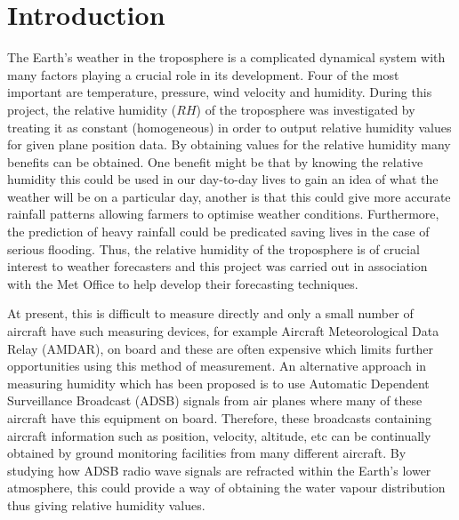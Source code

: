 \documentclass[11pt]{article}
\begin{document}
\vspace{5mm} %

\newpage

\tableofcontents


\setcounter{page}{1} %

\newpage


\section{Introduction}
\label{sec:introduction}

The Earth's weather in the troposphere is a complicated dynamical system with many factors playing a crucial role in its development. Four of the most important are temperature, pressure, wind velocity and humidity. During this project, the relative humidity ($RH$) of the troposphere was investigated by treating it as constant (homogeneous) in order to output relative humidity values for given plane position data. By obtaining values for the relative humidity many benefits can be obtained. One benefit might be that by knowing the relative humidity this could be used in our day-to-day lives to gain an idea of what the weather will be on a particular day, another is that this could give more accurate rainfall patterns allowing farmers to optimise weather conditions. Furthermore, the prediction of heavy rainfall could be predicated {\textemdash} saving lives in the case of serious flooding. Thus, the relative humidity of the troposphere is of crucial interest to weather forecasters and this project was carried out in association with the Met Office to help develop their forecasting techniques.

\vspace{2mm}
\noindent
At present, this is difficult to measure directly and only a small number of aircraft have such measuring devices, for example Aircraft Meteorological Data Relay (AMDAR), on board \cite{Paper01} and these are often expensive which limits further opportunities using this method of measurement. An alternative approach in measuring humidity which has been proposed \cite{Paper01} is to use Automatic Dependent Surveillance Broadcast (ADSB) signals from air planes where many of these aircraft have this equipment on board. Therefore, these broadcasts containing aircraft information such as position, velocity, altitude, etc can be continually obtained by ground monitoring facilities from many different aircraft. By studying how ADSB radio wave signals are refracted within the Earth's lower atmosphere, this could provide a way of obtaining the water vapour distribution thus giving relative humidity values.
\end{document}
